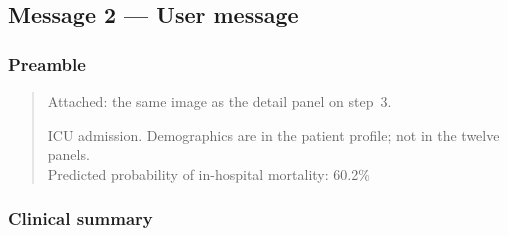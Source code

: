 \documentclass[12pt, a4paper]{article}
\begin{document}
\subsection*{Message 2 --- User message}

\subsubsection*{Preamble}

\begin{quote}
Attached: the same image as the detail panel on step~3.

ICU admission. Demographics are in the patient profile; not in the twelve
panels.\\
Predicted probability of in-hospital mortality: 60.2\%
\end{quote}

\subsubsection*{Clinical summary}
\end{document}
